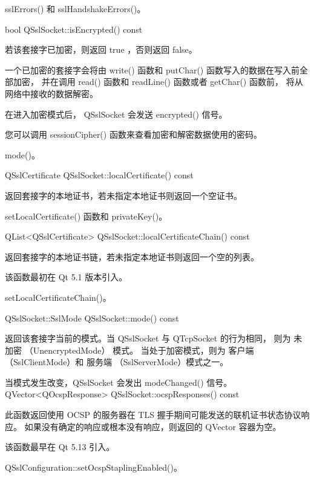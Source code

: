 \begin{notice}
sslErrors() 和 sslHandshakeErrors()。
\end{notice}

bool QSslSocket::isEncrypted() const

若该套接字已加密，则返回 true ，否则返回 false。

一个已加密的套接字会将由 write() 函数和 putChar() 函数写入的数据在写入前全部加密，
并在调用 read() 函数和 readLine() 函数或者 getChar() 函数前，
将从网络中接收的数据解密。

在进入加密模式后， QSslSocket 会发送 encrypted() 信号。

您可以调用 sessionCipher() 函数来查看加密和解密数据使用的密码。

\begin{notice}
mode()。
\end{notice}

QSslCertificate QSslSocket::localCertificate() const

返回套接字的本地证书，若未指定本地证书则返回一个空证书。

\begin{notice}
setLocalCertificate() 函数和 privateKey()。
\end{notice}

QList<QSslCertificate> QSslSocket::localCertificateChain() const

返回套接字的本地证书链，若未指定本地证书则返回一个空的列表。

该函数最初在 Qt 5.1 版本引入。

\begin{notice}
setLocalCertificateChain()。
\end{notice}

QSslSocket::SslMode QSslSocket::mode() const

返回该套接字当前的模式。当 QSslSocket 与 QTcpSocket 的行为相同，
则为 未加密 （UnencryptedMode） 模式。
当处于加密模式，则为 客户端 （SslClientMode）和 服务端 （SslServerMode）模式之一。

当模式发生改变，QSslSocket 会发出 modeChanged() 信号。
QVector<QOcspResponse> QSslSocket::ocspResponses() const

此函数返回使用 OCSP 的服务器在 TLS 握手期间可能发送的联机证书状态协议响应。 如果没有确定的响应或根本没有响应，则返回的 QVector 容器为空。

该函数最早在 Qt 5.13 引入。


\begin{notice}
QSslConfiguration::setOcspStaplingEnabled()。
\end{notice}

